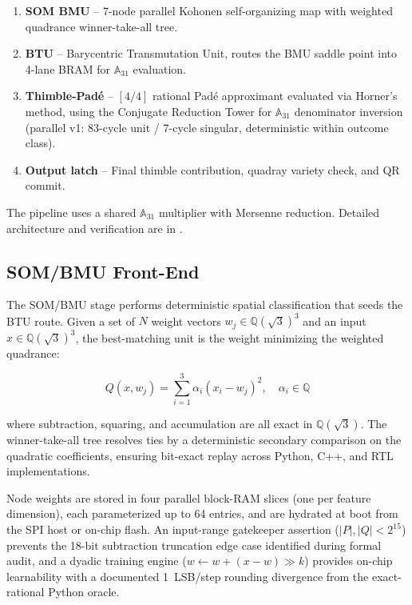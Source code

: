 \documentclass[10pt,twocolumn]{article}
\begin{document}
\begin{enumerate}
\item[$\Phi_1$] \textbf{SOM BMU} -- 7-node parallel Kohonen self-organizing
  map with weighted quadrance winner-take-all tree.
\item[$\Phi_2$] \textbf{BTU} -- Barycentric Transmutation Unit, routes the
  BMU saddle point into 4-lane BRAM for $\mathbb{A}_{31}$ evaluation.
\item[$\Phi_3$] \textbf{Thimble-Pad\'e} -- $[4/4]$ rational Pad\'e approximant
  evaluated via Horner's method, using the Conjugate Reduction Tower for
  $\mathbb{A}_{31}$ denominator inversion (parallel v1: 83-cycle unit /
  7-cycle singular, deterministic within outcome class).
\item[$\Phi_4$] \textbf{Output latch} -- Final thimble contribution, quadray
  variety check, and QR commit.
\end{enumerate}

The pipeline uses a shared $\mathbb{A}_{31}$ multiplier with Mersenne
reduction. Detailed architecture and verification are in \cite{rplu2026}.

\subsection{SOM/BMU Front-End}
\label{sec:som}

The SOM/BMU stage performs deterministic spatial classification that seeds
the BTU route. Given a set of $N$ weight vectors
$w_j \in \mathbb{Q}(\sqrt{3})^3$ and an input
$x \in \mathbb{Q}(\sqrt{3})^3$, the best-matching unit is the weight
minimizing the weighted quadrance:

\begin{equation}
Q(x, w_j) = \sum_{i=1}^{3} \alpha_i (x_i - w_j)^2,\quad
\alpha_i \in \mathbb{Q}
\label{eq:weighted_quadrance}
\end{equation}

where subtraction, squaring, and accumulation are all exact in
$\mathbb{Q}(\sqrt{3})$. The winner-take-all tree resolves ties by a
deterministic secondary comparison on the quadratic coefficients, ensuring
bit-exact replay across Python, C++, and RTL implementations.

Node weights are stored in four parallel block-RAM slices (one per feature
dimension), each parameterized up to 64 entries, and are hydrated at boot from
the SPI host or on-chip flash. An input-range gatekeeper assertion
($|P|,|Q| < 2^{15}$) prevents the 18-bit subtraction truncation edge case
identified during formal audit, and a dyadic training engine
($w \leftarrow w + (x-w) \gg k$) provides on-chip learnability with a
documented 1~LSB/step rounding divergence from the exact-rational Python
oracle.
\end{document}
